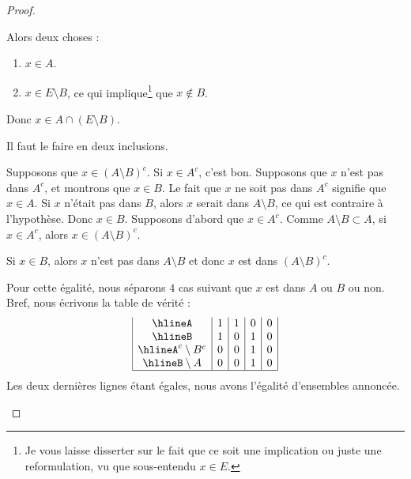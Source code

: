 \begin{proof}
\begin{subproof}
\begin{subproof}
			Alors deux choses :
			\begin{enumerate}
				\item
				      \( x\in A\).
				\item
				      \( x\in E\setminus B\), ce qui implique\footnote{Je vous laisse disserter sur le fait que ce soit une implication ou juste une reformulation, vu que sous-entendu \( x\in E\).} que \( x\not\in B\).
			\end{enumerate}
			Donc \( x\in A\cap (E\setminus B)\).
		\end{subproof}
		Il faut le faire en deux inclusions.
		\begin{subproof}
			Supposons que \( x\in(A\setminus B)^c\). Si \( x\in A^c\), c'est bon. Supposons que \( x\) n'est pas dans \( A^c\), et montrons que \( x\in B\). Le fait que \( x\) ne soit pas dans \( A^c\) signifie que \( x\in A\). Si \( x\) n'était pas dans \( B\), alors \( x\) serait dans \( A\setminus B\), ce qui est contraire à l'hypothèse. Donc \( x\in B\).
			Supposons d'abord que \( x\in A^c\). Comme \( A\setminus B\subset A\), si \( x\in A^c\), alors \( x\in (A\setminus B)^c\).

			Si \( x\in B\), alors \( x\) n'est pas dans \( A\setminus B\) et donc \( x\) est dans \( (A\setminus B)^c\).
		\end{subproof}
		Pour cette égalité, nous séparons \( 4\) cas suivant que \( x\) est dans \( A\) ou \( B\) ou non. Bref, nous écrivons la table de vérité :
		\begin{equation}
			\begin{array}{|c|c|c|c|c|}
				\hline%
				A                & 1 & 1 & 0 & 0 \\
				\hline%
				B                & 1 & 0 & 1 & 0 \\
				\hline%
				A^c\setminus B^c & 0 & 0 & 1 & 0 \\
				\hline%
				B\setminus A     & 0 & 0 & 1 & 0 \\
				\hline%
			\end{array}
		\end{equation}
		Les deux dernières lignes étant égales, nous avons l'égalité d'ensembles annoncée.
	\end{subproof}
\end{proof}

